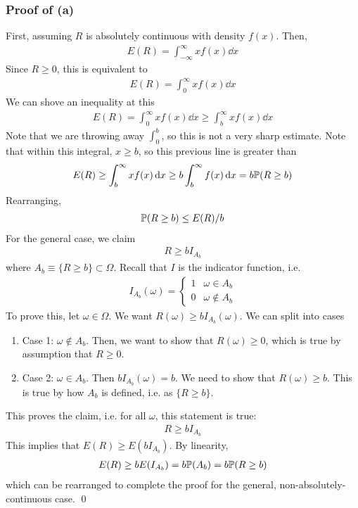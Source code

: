 \subsubsection{Proof of (a)}
First, assuming $R$ is absolutely continuous with density $f(x)$. Then,
\begin{align}
    E(R) = \int_{-\infty}^\infty x f(x) \dd{x}
\end{align}
Since $R \ge 0$, this is equivalent to
\begin{align}
    E(R) = \int_{0}^\infty x f(x) \dd{x}
\end{align}
We can shove an inequality at this
\begin{align}
    E(R) = \int_{0}^\infty x f(x) \dd{x}\ge \int_b^\infty x f(x) \dd{x}
\end{align}
Note that we are throwing away $\int_0^b$, so this is not a very sharp estimate. Note that within this integral, $x \ge b$, so this previous line is greater than
\begin{align}
    E(R) \ge \int_b^\infty x f(x) \dd{x} \ge b\int_b^\infty f(x) \dd{x} = b \mathbb{P}(R \ge b)
\end{align}
Rearranging,
\begin{align}
    \mathbb{P}(R \ge b) \le E(R)/b
\end{align}
For the general case, we claim
\begin{align}
    R \ge b I_{A_b}
\end{align}
where $A_b \equiv \{ R \ge b \} \subset \Omega$. Recall that $I$ is the indicator function, i.e.
\begin{align}
    I_{A_b}(\omega) = \begin{cases}
        1 & \omega \in A_b\\
        0 & \omega \notin A_b
    \end{cases}
\end{align}
To prove this, let $\omega \in \Omega$. We want $R(\omega) \ge b I_{A_b}(\omega)$. We can split into cases
\begin{enumerate}
    \item Case 1: $\omega \notin A_b$. Then, we want to show that $R(\omega) \ge 0$, which is true by assumption that $R \ge 0$.
    \item Case 2: $\omega \in A_b$. Then $b I_{A_b}(\omega) = b$. We need to show that $R(\omega) \ge b$. This is true by how $A_b$ is defined, i.e. as $\{ R \ge b \}$.
\end{enumerate}
This proves the claim, i.e. for all $\omega$, this statement is true:
\begin{align}
    R \ge b I_{A_b}
\end{align}
This implies that $E(R) \ge E(b I_{A_b})$. By linearity,
\begin{align}
    E(R) \ge b E\qty(I_{A_b}) = b\mathbb{P}(A_b) = b \mathbb{P}(R \ge b)
\end{align}
which can be rearranged to complete the proof for the general, non-absolutely-continuous case.
\qed

